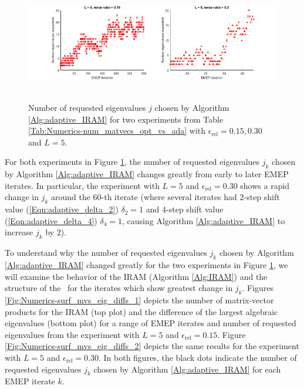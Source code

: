 \begin{enumerate}
\begin{figure}[H]
\centering
\hbox{\hspace{-1.5cm} \includegraphics[scale=0.6]{Numerics-num_eigs_req_ada_2_exps} }\vspace{0.0cm}
	\caption{Number of requested eigenvalues $j$ chosen by Algorithm \ref{Alg:adaptive_IRAM} for two experiments from Table \ref{Tab:Numerics-num_matvecs_opt_vs_ada} with $\epsilon_\text{rel}=0.15, 0.30$ and $L=5$.}
\label{Fig:Numerics-num_req_eigs_2_exps}
\end{figure}


For both experiments in Figure \ref{Fig:Numerics-num_req_eigs_2_exps}, the number of requested eigenvalues $j_k$ chosen by Algorithm \ref{Alg:adaptive_IRAM} changes greatly from early to later EMEP iterates.  
In particular, the experiment with $L=5$ and $\epsilon_\text{rel} = 0.30$ shows a rapid change in $j_k$ around the $60$-th iterate (where several iterates had $2$-step shift value (\ref{Eqn:adaptive_delta_2}) $\delta_2 = 1$ and $4$-step shift value (\ref{Eqn:adaptive_delta_4}) $\delta_4 = 1$,  causing Algorithm \ref{Alg:adaptive_IRAM} to increase $j_k$ by $2$).



To understand why the number of requested eigenvalues $j_k$ chosen by Algorithm \ref{Alg:adaptive_IRAM} changed greatly for the two experiments in Figure \ref{Fig:Numerics-num_req_eigs_2_exps}, we will examine the behavior of the IRAM (Algorithm \ref{Alg:IRAM}) and the structure of the \emep \ for the iterates which show greatest change in $j_k$.
Figures \ref{Fig:Numerics-surf_mvs_eig_diffs_1} depicts the number of matrix-vector products for the IRAM (top plot) and the difference of the largest algebraic eigenvalues (bottom plot) for a range of EMEP iterates and number of requested eigenvalues from the experiment with $L=5$ and $\epsilon_\text{rel} = 0.15$.
Figure \ref{Fig:Numerics-surf_mvs_eig_diffs_2} depicts the same results for the experiment with $L=5$ and $\epsilon_\text{rel} = 0.30$.
In both figures, the black dots indicate the number of requested eigenvalues $j_k$ chosen by Algorithm \ref{Alg:adaptive_IRAM} for each EMEP iterate $k$.




\end{enumerate}
